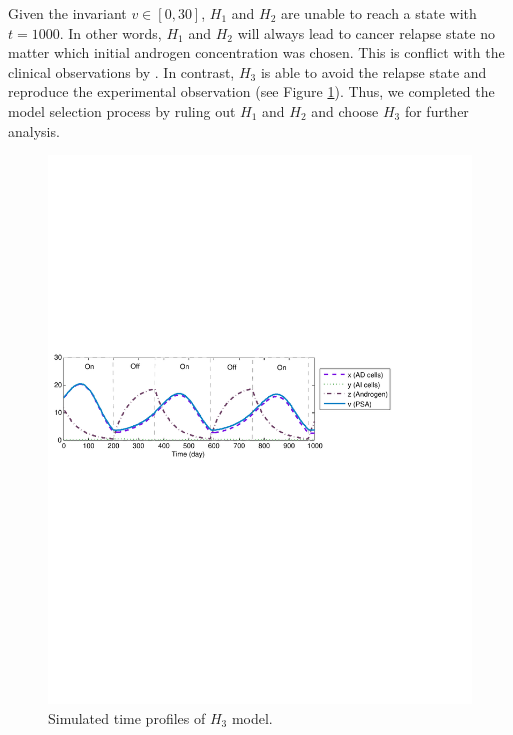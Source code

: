 Given the invariant $v \in [0,30]$, $H_1$ and $H_2$ are unable to reach a state with $t=1000$. In other words, $H_1$ and $H_2$ will always lead to cancer relapse state no matter which initial androgen concentration was chosen. This is conflict with the clinical observations by \cite{bruchovsky06,bruchovsky07}. In contrast, $H_3$ is able to avoid the relapse state and reproduce the experimental observation (see Figure \ref{prostate-fig1}). Thus, we completed the model selection process by ruling out $H_1$ and $H_2$ and choose $H_3$ for further analysis.


\begin{figure}[htb]
\centering
\includegraphics[scale=0.6]{fig-prostatetraj}
\caption{Simulated time profiles of $H_3$ model.}
\label{prostate-fig1}
\end{figure}

